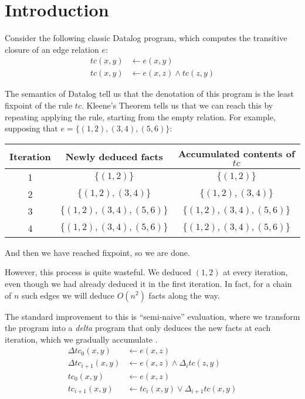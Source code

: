 \section{Introduction}
\label{sec:intro}

Consider the following classic Datalog program, which computes the transitive
closure of an edge relation $e$:
\begin{align*}
  tc(x, y) &\leftarrow e(x, y)\\
  tc(x, y) &\leftarrow e(x, z) \wedge tc(z, y)
\end{align*}

The semantics of Datalog tell us that the denotation of this program is the
least fixpoint of the rule $tc$. Kleene's Theorem tells us that we can reach
this by repeating applying the rule, starting from the empty relation. For example, supposing
that $e = \{ (1, 2), (3, 4), (5, 6) \}$:

\begin{center}
  \begin{tabular} {|c|c|c|}
    \hline
    Iteration & Newly deduced facts & Accumulated contents of $tc$ \\
    \hline
    1 & $\{ (1, 2)\}$ & $\{ (1, 2) \}$\\
    2 & $\{ (1,2), (3,4) \}$ & $\{ (1, 2), (3,4) \}$\\
    3 & $\{ (1,2), (3,4), (5,6) \}$ & $\{ (1, 2), (3,4), (5,6) \}$\\
    4 & $\{ (1,2), (3,4), (5,6) \}$ & $\{ (1, 2), (3,4), (5,6) \}$\\
    \hline 
  \end{tabular}
\end{center}

And then we have reached fixpoint, so we are done.

However, this process is quite wasteful. We deduced $(1,2)$ at every iteration,
even though we had already deduced it in the first iteration. In fact, for a
chain of $n$ such edges we will deduce $O(n^2)$ facts along the way.

The standard improvement to this is ``semi-naive'' evaluation, where we transform
the program into a \emph{delta} program that only deduces the new facts at each
iteration, which we gradually accumulate \autocite[See][section
13.1]{abiteboul1995foundations}.
\begin{align*}
  \Delta tc_{0}(x, y) &\leftarrow e(x, z)\\
  \Delta tc_{i+1}(x, y) &\leftarrow e(x, z) \wedge \Delta_i tc(z, y)\\
  tc_{0}(x, y) &\leftarrow e(x, z)\\
  tc_{i+1}(x, y) &\leftarrow tc_{i}(x,y) \vee \Delta_{i+1} tc(x,y)
\end{align*}

